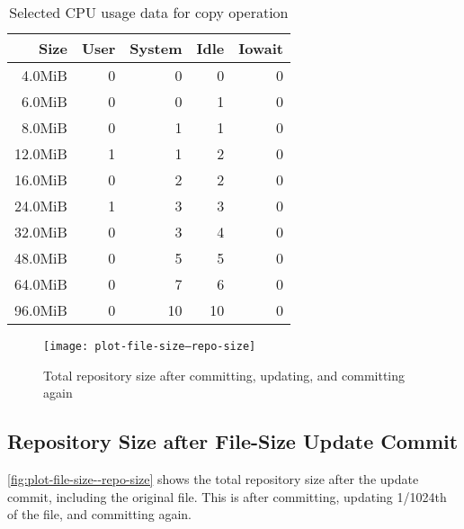 \begin{table}[p]
    \caption{Selected CPU usage data for copy operation}
    \label{copy-cpu-data}

    \centering
    \begin{tabular}{r r r r r}
        Size & User & System & Idle & Iowait \\
        \midrule
  4.0MiB &    0    &      0    &      0    &      0 \\
  6.0MiB &    0    &      0    &      1    &      0 \\
  8.0MiB &    0    &      1    &      1    &      0 \\
 12.0MiB &    1    &      1    &      2    &      0 \\
 16.0MiB &    0    &      2    &      2    &      0 \\
 24.0MiB &    1    &      3    &      3    &      0 \\
 32.0MiB &    0    &      3    &      4    &      0 \\
 48.0MiB &    0    &      5    &      5    &      0 \\
 64.0MiB &    0    &      7    &      6    &      0 \\
 96.0MiB &    0    &     10    &     10    &      0 \\
    \end{tabular}
\end{table}

%


\begin{figure}[p]
    \begin{leftfullpage}
        \caption{Total repository size after committing, updating, and
        committing again}
        \label{fig:plot-file-size--repo-size}
        \centering

        \explaindiskspaceplot

        \texttt{[image: plot-file-size--repo-size]}
    \end{leftfullpage}
\end{figure}

\cleardoublepage

\subsection{Repository Size after File-Size Update Commit}

\autoref{fig:plot-file-size--repo-size} shows the total \gls{repository} size
after the update \gls{commit}, including the original file. This is after
committing, updating \num{1/1024}th of the file, and committing again.

